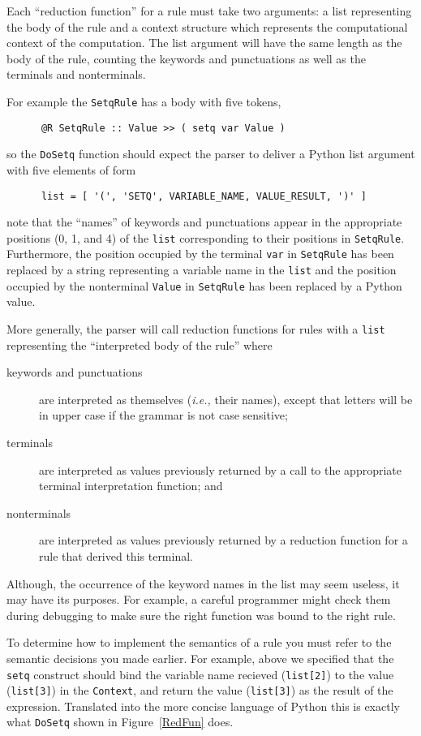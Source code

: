 Each ``reduction function'' for a rule must take two arguments:
a list representing the body of the rule and a context
structure which represents the computational context of the
computation.  The list argument will have the same length
as the body of the rule, counting the keywords and punctuations
as well as the terminals and nonterminals.

For example the {\tt SetqRule} has a body with five tokens, 
\begin{verbatim}
      @R SetqRule :: Value >> ( setq var Value )
\end{verbatim}
so the
{\tt DoSetq} function should expect the parser to deliver a
Python list argument with five elements of form
\begin{verbatim}
      list = [ '(', 'SETQ', VARIABLE_NAME, VALUE_RESULT, ')' ]
\end{verbatim}
note that the ``names'' of keywords and punctuations appear
in the appropriate positions (0, 1, and 4) of the {\tt list}
corresponding to their positions in {\tt SetqRule}.
Furthermore, the position occupied by the terminal
{\tt var} in {\tt SetqRule} has been replaced by a string
representing a variable name in the {\tt list} and the
position occupied by the nonterminal {\tt Value} in
{\tt SetqRule} has been replaced by a Python value.

More generally, the parser will call reduction functions for
rules with a {\tt list} representing the ``interpreted
body of the rule'' where
\begin{description}
\item[keywords and punctuations]
are interpreted as themselves ({\em i.e.,} their names),
except that letters will be in upper case if the grammar
is not case sensitive;
\item[terminals]
are interpreted as values previously returned by a call to
the appropriate terminal interpretation function; and
\item[nonterminals]
are interpreted as values previously returned by a
reduction function for a rule that derived this terminal.
\end{description}
Although, the occurrence of the keyword names in the list may seem
useless, it may have its purposes.  For example,
a careful programmer might check them during debugging
to make sure the right function was bound to the right rule.

To determine how to implement the semantics of a rule
you must refer to the semantic decisions you made earlier.
For example, above we specified that the {\tt setq} construct
should bind the variable name recieved  ({\tt list[2]}) 
to the value ({\tt list[3]}) in the {\tt Context},
and return the value ({\tt list[3]}) 
as the result of the expression.
Translated into the more concise language of Python this is
exactly what {\tt DoSetq} shown in Figure~\ref{RedFun}
does.

